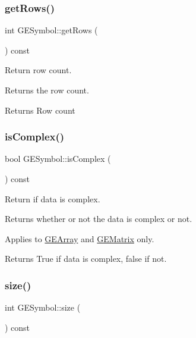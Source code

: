 \subsubsection{\texorpdfstring{get\+Rows()}{getRows()}}
{\footnotesize\ttfamily int G\+E\+Symbol\+::get\+Rows (\begin{DoxyParamCaption}{ }\end{DoxyParamCaption}) const\hspace{0.3cm}{\ttfamily [virtual]}}



Return row count. 

Returns the row count.

\begin{DoxyReturn}{Returns}
Row count 
\end{DoxyReturn}
\mbox{\label{class_g_e_symbol_a094de5283480bcfc9dd98f116ef3922b}} 
\subsubsection{\texorpdfstring{is\+Complex()}{isComplex()}}
{\footnotesize\ttfamily bool G\+E\+Symbol\+::is\+Complex (\begin{DoxyParamCaption}{ }\end{DoxyParamCaption}) const\hspace{0.3cm}{\ttfamily [virtual]}}



Return if data is complex. 

Returns whether or not the data is complex or not.

Applies to \hyperlink{class_g_e_array}{G\+E\+Array} and \hyperlink{class_g_e_matrix}{G\+E\+Matrix} only.

\begin{DoxyReturn}{Returns}
True if data is complex, false if not. 
\end{DoxyReturn}
\mbox{\label{class_g_e_symbol_a534b11b49a640420aaca9433db0c6479}} 
\subsubsection{\texorpdfstring{size()}{size()}}
{\footnotesize\ttfamily int G\+E\+Symbol\+::size (\begin{DoxyParamCaption}{ }\end{DoxyParamCaption}) const\hspace{0.3cm}{\ttfamily [virtual]}}



